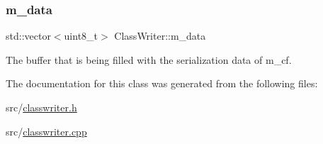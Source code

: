 \subsubsection{\texorpdfstring{m\+\_\+data}{m\_data}}
{\footnotesize\ttfamily std\+::vector$<$uint8\+\_\+t$>$ Class\+Writer\+::m\+\_\+data\hspace{0.3cm}{\ttfamily [private]}}



The buffer that is being filled with the serialization data of {\ttfamily m\+\_\+cf}. 



The documentation for this class was generated from the following files\+:\begin{DoxyCompactItemize}
\item 
src/\hyperlink{classwriter_8h}{classwriter.\+h}\item 
src/\hyperlink{classwriter_8cpp}{classwriter.\+cpp}\end{DoxyCompactItemize}
